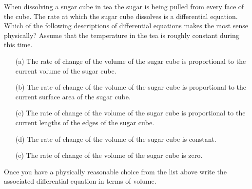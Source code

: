 \begin{problem}\label{prob:sugar_cube_1}
    When dissolving a sugar cube in tea the sugar is being pulled from every face of the
    cube.  The rate at which the sugar cube dissolves is a differential equation.  Which
    of the following descriptions of differential equations makes the most sense
    physically?  Assume that the temperature in the tea is roughly constant during this time.
    \begin{enumerate}
        \item[(a)] The rate of change of the volume of the sugar cube is proportional to
            the current volume of the sugar cube.
        \item[(b)] The rate of change of the volume of the sugar cube is proportional to
            the current surface area of the sugar cube.
        \item[(c)] The rate of change of the volume of the sugar cube is proportional to
            the current lengths of the edges of the sugar cube.
        \item[(d)] The rate of change of the volume of the sugar cube is constant.
        \item[(e)] The rate of change of the volume of the sugar cube is zero.
    \end{enumerate}
    Once you have a physically reasonable choice from the list above write the associated
    differential equation in terms of volume.  
\end{problem}

